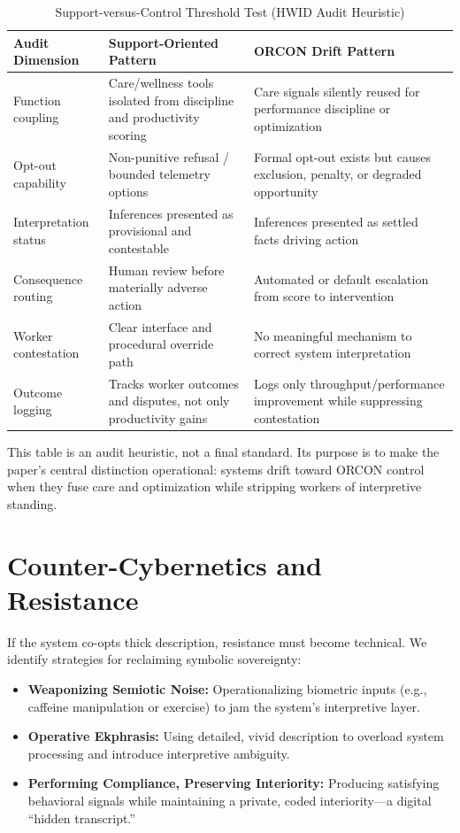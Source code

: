 \documentclass[11pt, a4paper]{article}
\begin{document}
\begin{table}[h]
\centering
\caption{Support-versus-Control Threshold Test (HWID Audit Heuristic)}
\label{tab:support_control_test}
\begin{tabular}{@{}p{}p{}p{}@{}}
\toprule
\textbf{Audit Dimension} & \textbf{Support-Oriented Pattern} & \textbf{ORCON Drift Pattern} \\ \midrule
Function coupling & Care/wellness tools isolated from discipline and productivity scoring & Care signals silently reused for performance discipline or optimization \\
Opt-out capability & Non-punitive refusal / bounded telemetry options & Formal opt-out exists but causes exclusion, penalty, or degraded opportunity \\
Interpretation status & Inferences presented as provisional and contestable & Inferences presented as settled facts driving action \\
Consequence routing & Human review before materially adverse action & Automated or default escalation from score to intervention \\
Worker contestation & Clear interface and procedural override path & No meaningful mechanism to correct system interpretation \\
Outcome logging & Tracks worker outcomes and disputes, not only productivity gains & Logs only throughput/performance improvement while suppressing contestation \\ \bottomrule
\end{tabular}
\end{table}

This table is an audit heuristic, not a final standard. Its purpose is to make the paper's central distinction operational: systems drift toward ORCON control when they fuse care and optimization while stripping workers of interpretive standing.

\section{Counter-Cybernetics and Resistance}

If the system co-opts thick description, resistance must become technical. We identify strategies for reclaiming symbolic sovereignty:
\begin{itemize}
    \item \textbf{Weaponizing Semiotic Noise:} Operationalizing biometric inputs (e.g., caffeine manipulation or exercise) to jam the system's interpretive layer.
    \item \textbf{Operative Ekphrasis:} Using detailed, vivid description to overload system processing and introduce interpretive ambiguity.
    \item \textbf{Performing Compliance, Preserving Interiority:} Producing satisfying behavioral signals while maintaining a private, coded interiority—a digital ``hidden transcript.''
\end{itemize}
\end{document}
